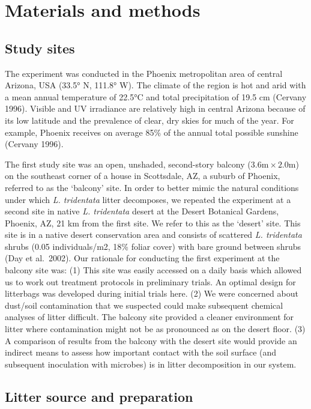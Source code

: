 \documentclass[
]{article}
\author{}
\date{\vspace{-2.5em}}
\begin{document}
\section{Materials and methods}\label{materials-and-methods}

\subsection{Study sites}\label{study-sites}

The experiment was conducted in the Phoenix metropolitan area of central
Arizona, USA (33.5° N, 111.8° W). The climate of the region is hot and
arid with a mean annual temperature of 22.5°C and total precipitation of
19.5 cm (Cervany 1996). Visible and UV irradiance are relatively high in
central Arizona because of its low latitude and the prevalence of clear,
dry skies for much of the year. For example, Phoenix receives on average
85\% of the annual total possible sunshine (Cervany 1996).

The first study site was an open, unshaded, second-story balcony
(\(3.6  \text{m} \times 2.0  \text{m}\)) on the southeast corner of a
house in Scottsdale, AZ, a suburb of Phoenix, referred to as the
`balcony' site. In order to better mimic the natural conditions under
which \emph{L. tridentata} litter decomposes, we repeated the experiment
at a second site in native \emph{L. tridentata} desert at the Desert
Botanical Gardens, Phoenix, AZ, 21 km from the first site. We refer to
this as the `desert' site. This site is in a native desert conservation
area and consists of scattered \emph{L. tridentata} shrubs (0.05
individuals/m2, 18\% foliar cover) with bare ground between shrubs (Day
et al.~2002). Our rationale for conducting the first experiment at the
balcony site was: (1) This site was easily accessed on a daily basis
which allowed us to work out treatment protocols in preliminary trials.
An optimal design for litterbags was developed during initial trials
here. (2) We were concerned about dust/soil contamination that we
suspected could make subsequent chemical analyses of litter difficult.
The balcony site provided a cleaner environment for litter where
contamination might not be as pronounced as on the desert floor. (3) A
comparison of results from the balcony with the desert site would
provide an indirect means to assess how important contact with the soil
surface (and subsequent inoculation with microbes) is in litter
decomposition in our system.

\subsection{Litter source and
preparation}\label{litter-source-and-preparation}
\end{document}
